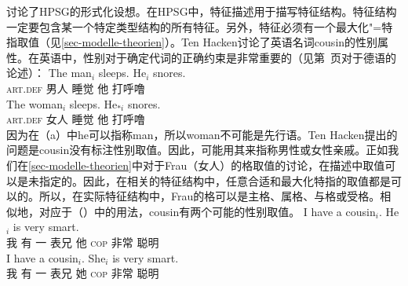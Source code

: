 \mbox{}讨论了HPSG\indexhpsgc 的形式化设想。在HPSG中，特征描述用于描写特征结构。特征结构一定要包含某一个特定类型结构的所有特征。另外，特征必须有一个最大化"=特指取值（见\ref{sec-modelle-theorien}）。Ten Hacken讨论了英语名词cousin的性别属性。在英语中，性别对于确定代词的正确约束是非常重要的（见第~\pageref{le-buch}页对于德语的论述）：
\eal
\ex 
\gll The man$_i$ sleeps. He$_i$ snores.\\
	 \textsc{art}.\textsc{def} 男人 睡觉 他  打呼噜\\
\ex 
\gll The woman$_i$ sleeps. He$_{*i}$ snores.\\
	 \textsc{art}.\textsc{def} 女人 睡觉 他  打呼噜\\
\zl
因为在（a）中he可以指称man，所以woman不可能是先行语。Ten Hacken提出的问题是cousin没有标注性别取值。因此，可能用其来指称男性或女性亲戚。正如我们在\ref{sec-modelle-theorien}中对于Frau（女人）的格取值的讨论，在描述中取值可以是未指定的。因此，在相关的特征结构中，任意合适和最大化特指的取值都是可以的。所以，在实际特征结构中，Frau的格可以是主格、属格、与格或受格。相似地，对应于（）中的用法，cousin有两个可能的性别取值。
\eal
\ex 
\gll I have a cousin$_i$. He$_i$ is very smart.\\
	 我 有 一 表兄 他 \textsc{cop} 非常 聪明\\
\ex 
\gll I have a cousin$_i$. She$_i$ is very smart.\\
	 我 有 一 表兄 她 \textsc{cop} 非常 聪明\\
\zl

